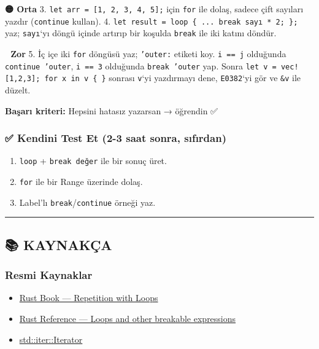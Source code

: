 \documentclass[12pt,a4paper]{article}
\begin{document}
\textbf{🟡 Orta}
3. \texttt{let\ arr\ =\ {[}1,\ 2,\ 3,\ 4,\ 5{]};} için \texttt{for} ile dolaş, sadece çift sayıları yazdır (\texttt{continue} kullan).
4. \texttt{let\ result\ =\ loop\ \{\ ...\ break\ sayı\ *\ 2;\ \};} yaz; \texttt{sayı}`yı döngü içinde artırıp bir koşulda \texttt{break} ile iki katını döndür.

\textbf{🔴 Zor}
5. İç içe iki \texttt{for} döngüsü yaz; \texttt{'outer:} etiketi koy. \texttt{i\ ==\ j} olduğunda \texttt{continue\ 'outer}, \texttt{i\ ==\ 3} olduğunda \texttt{break\ 'outer} yap. Sonra \texttt{let\ v\ =\ vec!{[}1,2,3{]};\ for\ x\ in\ v\ \{\ \}} sonrası \texttt{v}`yi yazdırmayı dene, \texttt{E0382}`yi gör ve \texttt{\&v} ile düzelt.

\textbf{Başarı kriteri:} Hepsini hatasız yazarsan → öğrendin ✅

\subsubsection{✅ Kendini Test Et (2-3 saat sonra, sıfırdan)}\label{kendini-test-et-2-3-saat-sonra-sıfırdan-8}

\begin{enumerate}
\def\labelenumi{\arabic{enumi}.}
\tightlist
\item
  \texttt{loop} + \texttt{break\ değer} ile bir sonuç üret.
\item
  \texttt{for} ile bir Range üzerinde dolaş.
\item
  Label'lı \texttt{break}/\texttt{continue} örneği yaz.
\end{enumerate}

\begin{center}\rule{0.5\linewidth}{0.5pt}\end{center}

\subsection{📚 KAYNAKÇA}\label{kaynakça-8}

\subsubsection{Resmi Kaynaklar}\label{resmi-kaynaklar-8}

\begin{itemize}
\tightlist
\item
  \href{https://doc.rust-lang.org/book/ch03-05-control-flow.html\#repetition-with-loops}{Rust Book --- Repetition with Loops}
\item
  \href{https://doc.rust-lang.org/reference/expressions/loop-expr.html}{Rust Reference --- Loops and other breakable expressions}
\item
  \href{https://doc.rust-lang.org/std/iter/trait.Iterator.html}{std::iter::Iterator}
\end{itemize}
\end{document}
